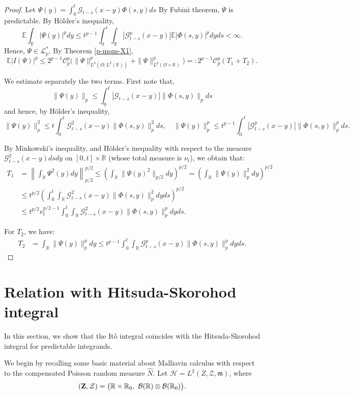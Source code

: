 \documentclass[12pt]{article}
\def\cB{\mathcal{B}}
\def\cC{\mathcal{C}}
\def\cG{\mathcal{G}}
\def\cH{\mathcal{H}}
\def\cL{\mathcal{L}}
\def\cZ{\mathcal{Z}}
\def\bE{\mathbb{E}}
\def\bR{\mathbb{R}}
\newcommand{\fm}{\mathfrak{m}}
\begin{document}
\begin{proof}
Let $\Psi(y)=\int_0^t \cG_{t-s}(x-y)\Phi(s,y)ds$
By Fubini theorem, $\Psi$ is predictable. By H\"older's inequality,
\[
\bE \int_{\bR}|\Psi(y)|^p dy \leq t^{p-1} \int_0^t  \int_{\bR}|\cG_{t-s}^p(x-y)|\bE|\Phi(s,y)|^pdyds<\infty.
\]
Hence, $\Psi \in \cL_p^*$.
By Theorem \ref{p-mom-X1},
\[
\bE|I(\Psi)|^p \leq 2^{p-1}\cC_p^p
\Big(\|\Psi\|_{L^p(\Omega;L^2(\bR))}^p+\|\Psi\|_{L^p(\Omega \times \bR)}^p \Big)=:2^{p-1}\cC_p^p(T_1+T_2).
\]

We estimate separately the two terms. First note that,
\[
\| \Psi(y)\|_p \leq \int_0^t |\cG_{t-s}(x-y)| \|\Phi(s,y)\|_p ds
\]
and hence, by H\"older's inequality,
\[
\| \Psi(y)\|_p^2  \leq t \int_0^t \cG_{t-s}^2 (x-y) \|\Phi(s,y)\|_p^2 ds, 
\quad 
\| \Psi(y)\|_p^p  \leq t^{p-1} \int_0^t |\cG_{t-s}^p (x-y)| \|\Phi(s,y)\|_p^p ds.
\]



By Minkowski's inequality, and H\"older's inequality with respect to the measure $\cG_{t-s}^2(x-y)dsdy$ on $[0,t] \times \bR$ (whose total measure is $\nu_t$),
we obtain that:
\begin{align*}
T_1 & =\left\| \int_{\bR} \Psi^2(y)dy\right\|_{p/2}^{p/2} \leq
\left( \int_{\bR} \|\Psi(y)^2\|_{p/2} dy \right)^{p/2} = \left( \int_{\bR} \|\Psi(y)\|_p^2 dy \right)^{p/2}\\
& \leq t^{p/2} \left( \int_0^t \int_{\bR} \cG_{t-s}^2 (x-y) \|\Phi(s,y)\|_p^2 dyds \right)^{p/2} \\
& \leq t^{p/2}\nu_{t}^{p/2-1} \int_0^t \int_{\bR} \cG_{t-s}^2 (x-y) \|\Phi(s,y)\|_p^{p} dyds.
\end{align*}

For $T_2$, we have:
\begin{align*}
T_2 & =\int_{\bR}\|\Psi(y)\|_p^p dy \leq t^{p-1} \int_0^t \int_{\bR} \cG_{t-s}^p(x-y) \|\Phi(s,y)\|_p^p dyds.
\end{align*}
\end{proof}





\section{Relation with  Hitsuda-Skorohod integral}
\label{section-Malliavin}


In this section, we show that the It\^o integral coincides with the Hitsuda-Skorohod integral for predictable integrands.

We begin by recalling some basic material about Malliavin calculus with respect to the compensated Poisson random measure $\widehat{N}$. Let $\cH=L^2(Z,\cZ,\fm)$, where
\[
({\bf Z},\cZ)=\big(\bR \times \bR_0,\ \cB(\bR) \otimes \cB(\bR_0)\big).
\]
\end{document}
